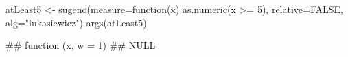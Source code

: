 \begin{Schunk}
% --begin: "quant1"
\begin{Sinput}
atLeast5 <- sugeno(measure=function(x) as.numeric(x >= 5),
                   relative=FALSE,
                   alg="lukasiewicz")
args(atLeast5)
\end{Sinput}
\begin{Soutput}
## function (x, w = 1) 
## NULL
\end{Soutput}
%
% --end: "quant1"
\end{Schunk}
